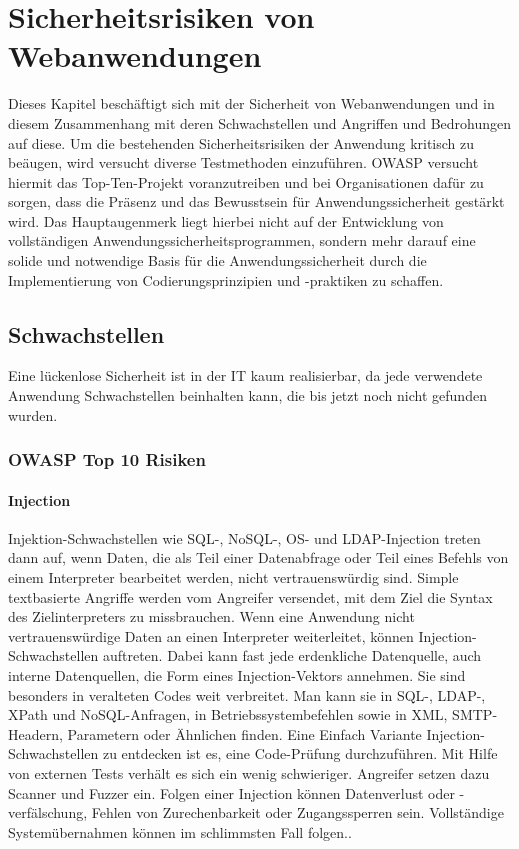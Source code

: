 \chapter{Sicherheitsrisiken von Webanwendungen}
\label{cha:k3}

Dieses Kapitel beschäftigt sich mit der Sicherheit von Webanwendungen und in diesem Zusammenhang mit deren Schwachstellen und Angriffen und Bedrohungen auf diese. Um die bestehenden Sicherheitsrisiken der Anwendung kritisch zu beäugen, wird versucht diverse Testmethoden einzuführen. OWASP versucht hiermit das Top-Ten-Projekt voranzutreiben und bei Organisationen dafür zu sorgen, dass die Präsenz und das Bewusstsein für Anwendungssicherheit gestärkt wird. Das Hauptaugenmerk liegt hierbei nicht auf der Entwicklung von vollständigen Anwendungssicherheitsprogrammen, sondern mehr darauf eine solide und notwendige Basis für die Anwendungssicherheit durch die Implementierung von Codierungsprinzipien und -praktiken zu schaffen.

\section{Schwachstellen}

Eine lückenlose Sicherheit ist in der IT kaum realisierbar, da jede verwendete Anwendung Schwachstellen beinhalten kann, die bis jetzt noch nicht gefunden wurden.

\subsection{OWASP Top 10 Risiken}

\subsubsection{Injection}

Injektion-Schwachstellen wie SQL-, NoSQL-, OS- und LDAP-Injection treten dann auf, wenn Daten, die als Teil einer Datenabfrage oder Teil eines Befehls von einem Interpreter bearbeitet werden, nicht vertrauenswürdig sind\cite[6]{owasp17top10}. Simple textbasierte Angriffe werden vom Angreifer versendet, mit dem Ziel die Syntax des Zielinterpreters zu missbrauchen. Wenn eine Anwendung nicht vertrauenswürdige Daten an einen Interpreter weiterleitet, können Injection-Schwachstellen auftreten. Dabei kann fast jede erdenkliche Datenquelle, auch interne Datenquellen, die Form eines Injection-Vektors annehmen. Sie sind besonders in veralteten Codes weit verbreitet. Man kann sie in SQL-, LDAP-, XPath und NoSQL-Anfragen, in Betriebssystembefehlen sowie in XML, SMTP-Headern, Parametern oder Ähnlichen finden. Eine Einfach Variante Injection-Schwachstellen zu entdecken ist es, eine Code-Prüfung durchzuführen. Mit Hilfe von externen Tests verhält es sich ein wenig schwieriger. Angreifer setzen dazu Scanner und Fuzzer ein. Folgen einer Injection können Datenverlust oder -verfälschung, Fehlen von Zurechenbarkeit oder Zugangssperren sein. Vollständige Systemübernahmen können im schlimmsten Fall folgen.\cite[7]{owasp17top10}.\\

